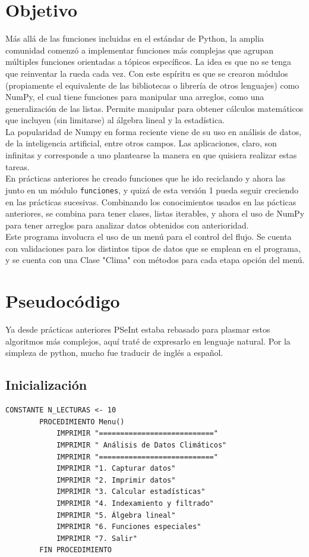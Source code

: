 \documentclass{assignment}
\begin{document}
	
	
	\section*{Objetivo}
	Más allá de las funciones incluidas en el estándar de Python, la amplia comunidad comenzó a implementar funciones más complejas que agrupan múltiples funciones orientadas a tópicos específicos. La idea es que no se tenga que reinventar la rueda cada vez. Con este espíritu es que se crearon módulos (propiamente el equivalente de las bibliotecas o librería de otros lenguajes) como NumPy, el cual tiene funciones para manipular una arreglos, como una generalización de las listas. Permite manipular para obtener cálculos matemáticos que incluyen (sin limitarse) al álgebra lineal y la estadística.\\
	La popularidad de Numpy en forma reciente viene de su uso en análisis de datos, de la inteligencia artificial, entre otros campos. Las aplicaciones, claro, son infinitas y corresponde a uno plantearse la manera en que quisiera realizar estas tareas.\\
	En prácticas anteriores he creado funciones que he ido reciclando y ahora las junto en un módulo {\tt funciones}, y quizá de esta versión 1 pueda seguir creciendo en las prácticas sucesivas.
	Combinando los conocimientos usados en las pácticas anteriores, se combina para tener clases, listas iterables, y ahora el uso de NumPy para tener arreglos para analizar datos obtenidos con anterioridad.\\
	Este programa involucra el uso de un menú para el control del flujo. Se cuenta con validaciones para los distintos tipos de datos que se emplean en el programa, y se cuenta con una Clase "Clima" con métodos para cada etapa opción del menú.
	\section*{Pseudocódigo}
	Ya desde prácticas anteriores PSeInt estaba rebasado para plasmar estos algoritmos más complejos, aquí traté de expresarlo en lenguaje natural. Por la simpleza de python, mucho fue traducir de inglés a español.
	\subsection*{Inicialización}
	\begin{lstlisting}[caption={Inicialización}, label={lst:inicio}]
		CONSTANTE N_LECTURAS <- 10
		PROCEDIMIENTO Menu()
			IMPRIMIR "==========================="
			IMPRIMIR " Análisis de Datos Climáticos"
			IMPRIMIR "==========================="
			IMPRIMIR "1. Capturar datos"
			IMPRIMIR "2. Imprimir datos"
			IMPRIMIR "3. Calcular estadísticas"
			IMPRIMIR "4. Indexamiento y filtrado"
			IMPRIMIR "5. Álgebra lineal"
			IMPRIMIR "6. Funciones especiales"
			IMPRIMIR "7. Salir"
		FIN PROCEDIMIENTO
	\end{lstlisting}
\end{document}
